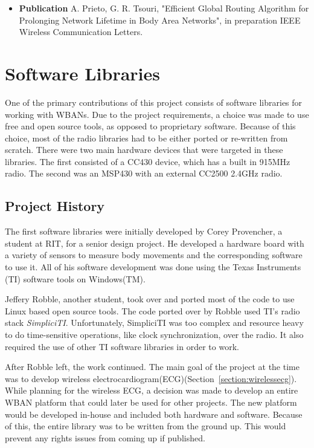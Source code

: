 \documentclass{article}
\begin{document}
\begin{itemize}
\item \textbf{Publication} A. Prieto, G. R. Tsouri, "Efficient Global Routing Algorithm for Prolonging Network Lifetime in Body Area Networks", in preparation IEEE Wireless Communication Letters.

\end{itemize}


\section{Software Libraries}\label{sec:wbansoftwarelib}
One of the primary contributions of this project consists of software libraries for working with WBANs. Due to the project requirements, a choice was made to use free and open source tools, as opposed to proprietary software. Because of this choice, most of the radio libraries had to be either ported or re-written from scratch. There were two main hardware devices that were targeted in these libraries. The first consisted of a CC430 device, which has a built in 915MHz radio. The second was an MSP430 with an external CC2500 2.4GHz radio.

\subsection{Project History}
The first software libraries were initially developed by Corey Provencher, a student at RIT, for a senior design project. He developed a hardware board with a variety of sensors to measure body movements and the corresponding software to use it. All of his software development was done using the Texas Instruments (TI) software tools on Windows(TM).

Jeffery Robble, another student, took over and ported most of the code to use Linux based open source tools. The code ported over by Robble used TI's radio stack \emph{SimpliciTI}. Unfortunately, SimpliciTI was too complex and resource heavy to do time-sensitive operations, like clock synchronization, over the radio. It also required the use of other TI software libraries in order to work.

After Robble left, the work continued. The main goal of the project at the time was to develop wireless electrocardiogram(ECG)(Section~\ref{section:wirelessecg}). While planning for the wireless ECG, a decision was made to develop an entire WBAN platform that could later be used for other projects. The new platform would be developed in-house and included both hardware and software. Because of this, the entire library was to be written from the ground up. This would prevent any rights issues from coming up if published.
\end{document}
